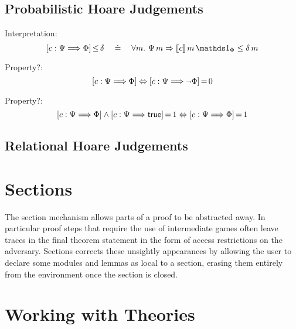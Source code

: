 \subsection{Probabilistic Hoare Judgements}

Interpretation:
\begin{displaymath}
\HoareLe{c}{\pre}{\post}{\delta} 
\quad\doteq\quad
\forall m.~ \pre\,m \Rightarrow [\![ c ]\!]\,m\,\charfun_\post \leq
\delta\,m
\end{displaymath}

Property?:
\begin{displaymath}
\left[{c}:{\Psi}\Longrightarrow{\Phi}\right]
\Leftrightarrow
{\left[{c}:{\Psi}\Longrightarrow{\neg\Phi}\right]}\,{=}\,{0}
\end{displaymath}

Property?:
\begin{displaymath}
\left[{c}:{\Psi}\Longrightarrow{\Phi}\right] \land {\left[{c}:{\Psi}\Longrightarrow{\mathsf{true}}\right]}\,{=}\,{1}
\Leftrightarrow
{\left[{c}:{\Psi}\Longrightarrow{\Phi}\right]}\,{=}\,{1}
\end{displaymath}

\subsection{Relational Hoare Judgements}

\section{Sections}
The section mechanism allows parts of a proof to be abstracted away. In
particular proof steps that require the use of intermediate games often leave
traces in the final theorem statement in the form of access restrictions on the
adversary. Sections corrects these unsightly appearances by allowing the user
to declare some modules and lemmas as local to a section, erasing them entirely
from the environment once the section is closed.


\section{Working with Theories\label{sec:cloning}}

\subsection{}




